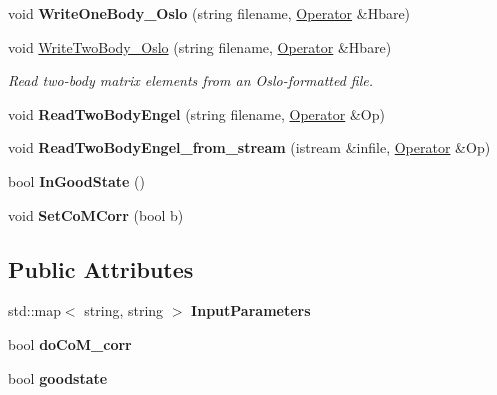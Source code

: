 \begin{DoxyCompactItemize}
\item 
\hypertarget{classReadWrite_a13494cd64fa5cd54c235494f2f6ad98a}{void {\bfseries Write\-One\-Body\-\_\-\-Oslo} (string filename, \hyperlink{classOperator}{Operator} \&Hbare)}\label{classReadWrite_a13494cd64fa5cd54c235494f2f6ad98a}

\item 
\hypertarget{classReadWrite_a7f1aa9a0701a15d2007524f7d31df1ef}{void \hyperlink{classReadWrite_a7f1aa9a0701a15d2007524f7d31df1ef}{Write\-Two\-Body\-\_\-\-Oslo} (string filename, \hyperlink{classOperator}{Operator} \&Hbare)}\label{classReadWrite_a7f1aa9a0701a15d2007524f7d31df1ef}

\begin{DoxyCompactList}\small\item\em Read two-\/body matrix elements from an Oslo-\/formatted file. \end{DoxyCompactList}\item 
\hypertarget{classReadWrite_a6d9f3e742be006c9b13eaf0670e58b99}{void {\bfseries Read\-Two\-Body\-Engel} (string filename, \hyperlink{classOperator}{Operator} \&Op)}\label{classReadWrite_a6d9f3e742be006c9b13eaf0670e58b99}

\item 
\hypertarget{classReadWrite_a7bc3e52488d9c68eff73e7fdf21c2902}{void {\bfseries Read\-Two\-Body\-Engel\-\_\-from\-\_\-stream} (istream \&infile, \hyperlink{classOperator}{Operator} \&Op)}\label{classReadWrite_a7bc3e52488d9c68eff73e7fdf21c2902}

\item 
\hypertarget{classReadWrite_a05ec8e21842e94d788bb36c7d11f46b9}{bool {\bfseries In\-Good\-State} ()}\label{classReadWrite_a05ec8e21842e94d788bb36c7d11f46b9}

\item 
\hypertarget{classReadWrite_a5e81dd4ce4adfe6fc08af81440003bb9}{void {\bfseries Set\-Co\-M\-Corr} (bool b)}\label{classReadWrite_a5e81dd4ce4adfe6fc08af81440003bb9}

\end{DoxyCompactItemize}
\subsection*{Public Attributes}
\begin{DoxyCompactItemize}
\item 
\hypertarget{classReadWrite_aa99ba50a35d8391285c1bdde1f1c206d}{std\-::map$<$ string, string $>$ {\bfseries Input\-Parameters}}\label{classReadWrite_aa99ba50a35d8391285c1bdde1f1c206d}

\item 
\hypertarget{classReadWrite_a3221f4b824dc385b066eca732339ee72}{bool {\bfseries do\-Co\-M\-\_\-corr}}\label{classReadWrite_a3221f4b824dc385b066eca732339ee72}

\item 
\hypertarget{classReadWrite_aaf2753e15a5e7f524d6fde9f15ab357b}{bool {\bfseries goodstate}}\label{classReadWrite_aaf2753e15a5e7f524d6fde9f15ab357b}

\end{DoxyCompactItemize}


